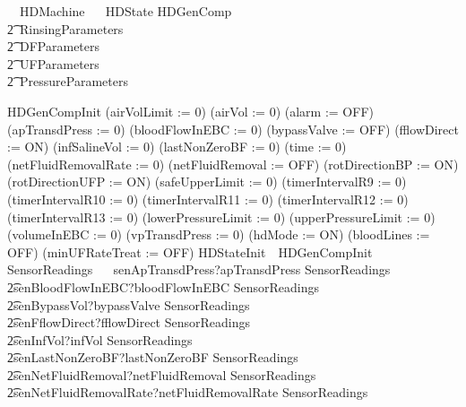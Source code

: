 \begin{circus}%
  \circprocess\ ~HDMachine ~\circdef~ \circbegin
\circstate HDState  HDGenComp
            \\\t2\land~RinsingParameters
            \\\t2\land~DFParameters
            \\\t2\land~UFParameters
            \\\t2\land~PressureParameters

HDGenCompInit \circdef
    (airVolLimit := 0)
    \circseq (airVol := 0)
    \circseq (alarm := OFF)
    \circseq (apTransdPress := 0)
    \circseq (bloodFlowInEBC := 0)
    \circseq (bypassValve := OFF)
    \circseq (fflowDirect := ON)
    \circseq (infSalineVol := 0)
    \circseq (lastNonZeroBF := 0)
    \circseq (time := 0)
    \circseq (netFluidRemovalRate := 0)
    \circseq (netFluidRemoval := OFF)
    \circseq (rotDirectionBP := ON)
    \circseq (rotDirectionUFP := ON)
    \circseq (safeUpperLimit := 0)
    \circseq (timerIntervalR9 := 0)
    \circseq (timerIntervalR10 := 0)
    \circseq (timerIntervalR11 := 0)
    \circseq (timerIntervalR12 := 0)
    \circseq (timerIntervalR13 := 0)
    \circseq (lowerPressureLimit := 0)
    \circseq (upperPressureLimit := 0)
    \circseq (volumeInEBC := 0)
    \circseq (vpTransdPress := 0)
    \circseq (hdMode := ON)
    \circseq (bloodLines := OFF)
    \circseq (minUFRateTreat := OFF)
HDStateInit~\circdef~HDGenCompInit
SensorReadings ~\circdef~
    senApTransdPress?apTransdPress \then SensorReadings\\
    \t2\extchoice senBloodFlowInEBC?bloodFlowInEBC \then SensorReadings\\
    \t2\extchoice senBypassVol?bypassValve \then SensorReadings\\
    \t2\extchoice senFflowDirect?fflowDirect \then SensorReadings\\
    \t2\extchoice senInfVol?infVol \then SensorReadings\\
    \t2\extchoice senLastNonZeroBF?lastNonZeroBF \then SensorReadings\\
    \t2\extchoice senNetFluidRemoval?netFluidRemoval \then SensorReadings\\
    \t2\extchoice senNetFluidRemovalRate?netFluidRemovalRate \then SensorReadings\\

\end{circus}
